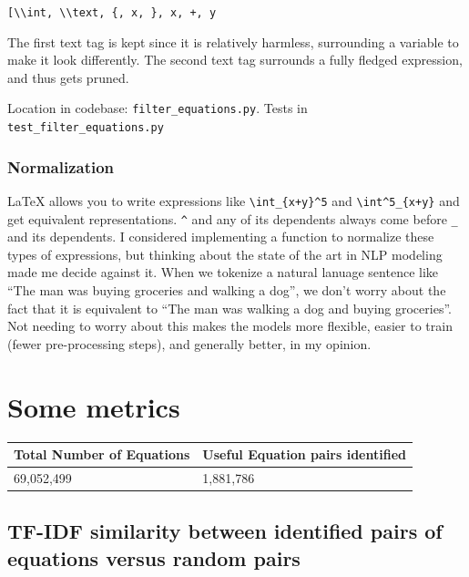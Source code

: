 \documentclass[]{article}
\begin{document}
\texttt{{[}\textquotesingle{}\textbackslash{}\textbackslash{}int\textquotesingle{},\ \textquotesingle{}\textbackslash{}\textbackslash{}text\textquotesingle{},\ \textquotesingle{}\{\textquotesingle{},\ \textquotesingle{}x\textquotesingle{},\ \textquotesingle{}\}\textquotesingle{},\ \textquotesingle{}x\textquotesingle{},\ \textquotesingle{}+\textquotesingle{},\ \textquotesingle{}y\textquotesingle{}{]}}

The first text tag is kept since it is relatively harmless, surrounding
a variable to make it look differently. The second text tag surrounds a
fully fledged expression, and thus gets pruned.

Location in codebase: \texttt{filter\_equations.py}. Tests in
\texttt{test\_filter\_equations.py}

\hypertarget{normalization}{%
\subsubsection{Normalization}\label{normalization}}

LaTeX allows you to write expressions like
\texttt{\textbackslash{}int\_\{x+y\}\^{}5} and
\texttt{\textbackslash{}int\^{}5\_\{x+y\}} and get equivalent
representations. \texttt{\^{}} and any of its dependents always come
before \texttt{\_} and its dependents. I considered implementing a
function to normalize these types of expressions, but thinking about the
state of the art in NLP modeling made me decide against it. When we
tokenize a natural lanuage sentence like ``The man was buying groceries
and walking a dog'', we don't worry about the fact that it is equivalent
to ``The man was walking a dog and buying groceries''. Not needing to
worry about this makes the models more flexible, easier to train (fewer
pre-processing steps), and generally better, in my opinion.

\hypertarget{some-metrics}{%
\section{Some metrics}\label{some-metrics}}

\begin{longtable}[]{@{}ll@{}}
\toprule
Total Number of Equations & Useful Equation pairs
identified\tabularnewline
\midrule
\endhead
69,052,499 & 1,881,786\tabularnewline
\bottomrule
\end{longtable}

\hypertarget{tf-idf-similarity-between-identified-pairs-of-equations-versus-random-pairs}{%
\subsection{TF-IDF similarity between identified pairs of equations
versus random
pairs}\label{tf-idf-similarity-between-identified-pairs-of-equations-versus-random-pairs}}
\end{document}
